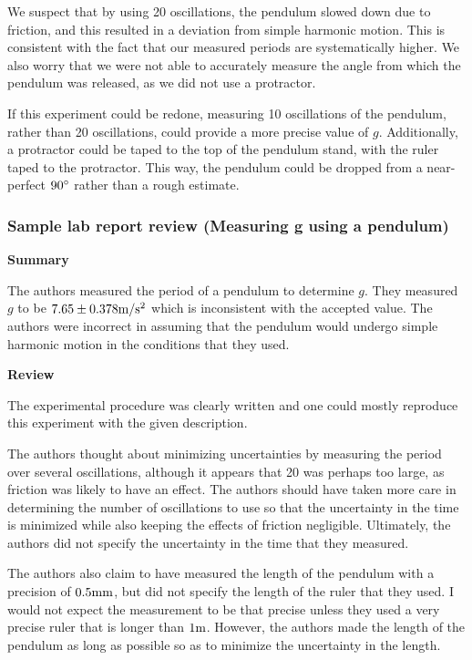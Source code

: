 We suspect that by using 20 oscillations, the pendulum slowed down due to friction, and this resulted in a deviation from simple harmonic motion. This is consistent with the fact that our measured periods are systematically higher. We also worry that we were not able to accurately measure the angle from which the pendulum was released, as we did not use a protractor.

If this experiment could be redone, measuring 10 oscillations of the pendulum, rather than 20 oscillations, could provide a more precise value of $g$. Additionally, a protractor could be taped to the top of the pendulum stand, with the ruler taped to the protractor. This way, the pendulum could be dropped from a near-perfect $90 {\rm \degree}$ rather than a rough estimate.

\subsubsection{Sample lab report review (Measuring g using a pendulum)}

\textbf{Summary}

The authors measured the period of a pendulum to determine $g$. They measured $g$ to be $7.65\pm0.378 {\rm m/s^2}$ which is inconsistent with the accepted value. The authors were incorrect in assuming that the pendulum would undergo simple harmonic motion in the conditions that they used.

\textbf{Review}

The experimental procedure was clearly written and one could mostly reproduce this experiment with the given description.

The authors thought about minimizing uncertainties by measuring the period over several oscillations, although it appears that 20 was perhaps too large, as friction was likely to have an effect. The authors should have taken more care in determining the number of oscillations to use so that the uncertainty in the time is minimized while also keeping the effects of friction negligible. Ultimately, the authors did not specify the uncertainty in the time that they measured.

The authors also claim to have measured the length of the pendulum with a precision of $0.5 {\rm mm}$, but did not specify the length of the ruler that they used. I would not expect the measurement to be that precise unless they used a very precise ruler that is longer than $1 {\rm m}$. However, the authors made the length of the pendulum as long as possible so as to minimize the uncertainty in the length.

